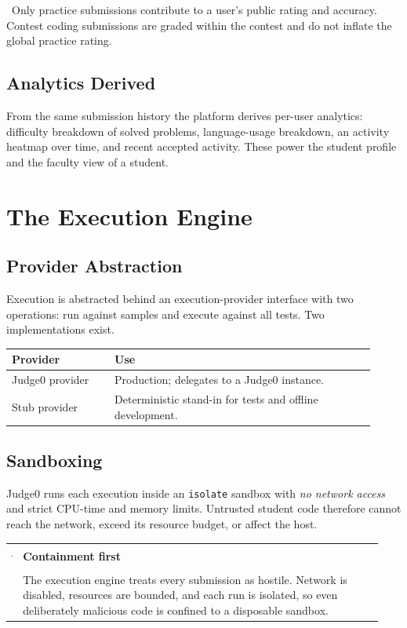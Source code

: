 \documentclass[12pt,a4paper,oneside]{report}
\makeatletter
\newcommand{\code}[1]{\texttt{#1}}
\newenvironment{callout}[1]{\par\vspace{4pt}\noindent
  \begin{tabular}{@{}p{0.014\linewidth}@{\hspace{0.6em}}p{0.93\linewidth}@{}}
  \textcolor{boxframe}{\rule{2pt}{\baselineskip}} & \textbf{\textcolor{tcetblue}{#1}}\\[2pt] & }{\end{tabular}\par\vspace{6pt}}
\newcommand{\note}[1]{\par\vspace{3pt}\noindent{\color{tcetaccent}\textbf{Note.}}~#1\par\vspace{3pt}}
\makeatother
\begin{document}
\note{Only practice submissions contribute to a user's public rating and
accuracy. Contest coding submissions are graded within the contest and do not
inflate the global practice rating.}

\section{Analytics Derived}
From the same submission history the platform derives per-user analytics:
difficulty breakdown of solved problems, language-usage breakdown, an activity
heatmap over time, and recent accepted activity. These power the student profile
and the faculty view of a student.

\chapter{The Execution Engine}
\section{Provider Abstraction}
Execution is abstracted behind an execution-provider interface with two
operations: run against samples and execute against all tests. Two
implementations exist.
\begin{longtable}{@{}p{0.26\linewidth} p{0.66\linewidth}@{}}
\toprule
\textbf{Provider} & \textbf{Use}\\
\midrule
\endhead
Judge0 provider & Production; delegates to a Judge0 instance.\\
Stub provider & Deterministic stand-in for tests and offline development.\\
\bottomrule
\end{longtable}

\section{Sandboxing}
Judge0 runs each execution inside an \code{isolate} sandbox with \emph{no network
access} and strict CPU-time and memory limits. Untrusted student code therefore
cannot reach the network, exceed its resource budget, or affect the host.

\begin{callout}{Containment first}
The execution engine treats every submission as hostile. Network is disabled,
resources are bounded, and each run is isolated, so even deliberately malicious
code is confined to a disposable sandbox.
\end{callout}
\end{document}
